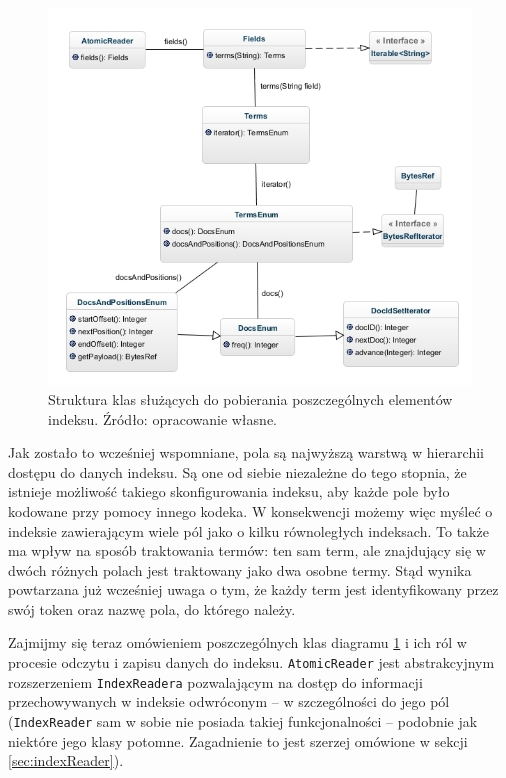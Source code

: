\begin{figure}[here]
 \includegraphics[scale=0.64]{pictures/LuceneAccessAPI_1.jpg}
 \caption{Struktura klas służących do pobierania poszczególnych elementów indeksu. Źródło: opracowanie własne.\label{fig:indexApi}}
\end{figure}

Jak zostało to wcześniej wspomniane, pola są najwyższą warstwą w hierarchii dostępu do danych indeksu. Są one od siebie niezależne do tego stopnia, że istnieje możliwość takiego skonfigurowania indeksu, aby każde pole było kodowane przy pomocy innego kodeka. W konsekwencji możemy więc myśleć o indeksie zawierającym wiele pól jako o kilku równoległych indeksach. To także ma wpływ na sposób traktowania termów: ten sam term, ale znajdujący się w dwóch różnych polach jest traktowany jako dwa osobne termy. Stąd wynika powtarzana już wcześniej uwaga o tym, że każdy term jest identyfikowany przez swój token oraz nazwę pola, do którego należy.

Zajmijmy się teraz omówieniem poszczególnych klas diagramu \ref{fig:indexApi} i ich ról w procesie odczytu i zapisu danych do indeksu. \texttt{AtomicReader} jest abstrakcyjnym rozszerzeniem \texttt{IndexReadera} pozwalającym na dostęp do informacji przechowywanych w indeksie odwróconym -- w szczególności do jego pól (\texttt{IndexReader} sam w sobie nie posiada takiej funkcjonalności -- podobnie jak niektóre jego klasy potomne. Zagadnienie to jest szerzej omówione w sekcji \ref{sec:indexReader}). 

